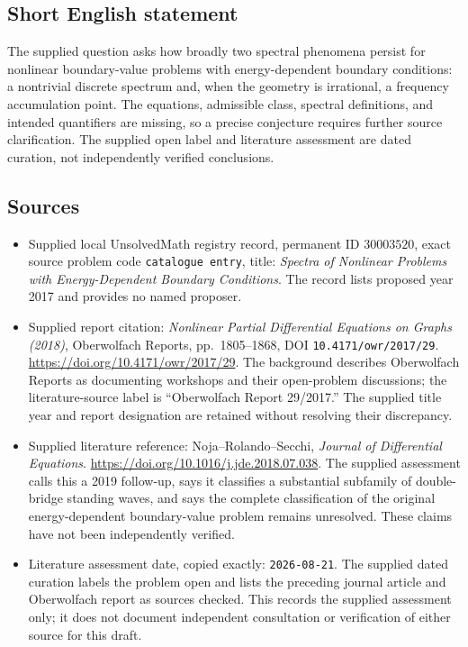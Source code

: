 \documentclass[11pt]{article}
\begin{document}
\subsection{Short English statement}
The supplied question asks how broadly two spectral phenomena persist for nonlinear boundary-value problems with energy-dependent boundary conditions: a nontrivial discrete spectrum and, when the geometry is irrational, a frequency accumulation point. The equations, admissible class, spectral definitions, and intended quantifiers are missing, so a precise conjecture requires further source clarification. The supplied open label and literature assessment are dated curation, not independently verified conclusions.
\subsection{Sources}
\begin{itemize}
\item Supplied local UnsolvedMath registry record, permanent ID \(30003520\), exact source problem code \texttt{catalogue entry}, title: \emph{Spectra of Nonlinear Problems with Energy-Dependent Boundary Conditions}. The record lists proposed year 2017 and provides no named proposer.
\item Supplied report citation: \emph{Nonlinear Partial Differential Equations on Graphs (2018)}, Oberwolfach Reports, pp.\ 1805--1868, DOI \texttt{10.4171/owr/2017/29}. \url{https://doi.org/10.4171/owr/2017/29}. The background describes Oberwolfach Reports as documenting workshops and their open-problem discussions; the literature-source label is ``Oberwolfach Report 29/2017.'' The supplied title year and report designation are retained without resolving their discrepancy.
\item Supplied literature reference: Noja--Rolando--Secchi, \emph{Journal of Differential Equations}. \url{https://doi.org/10.1016/j.jde.2018.07.038}. The supplied assessment calls this a 2019 follow-up, says it classifies a substantial subfamily of double-bridge standing waves, and says the complete classification of the original energy-dependent boundary-value problem remains unresolved. These claims have not been independently verified.
\item Literature assessment date, copied exactly: \texttt{2026-08-21}. The supplied dated curation labels the problem open and lists the preceding journal article and Oberwolfach report as sources checked. This records the supplied assessment only; it does not document independent consultation or verification of either source for this draft.
\end{itemize}
\end{document}
